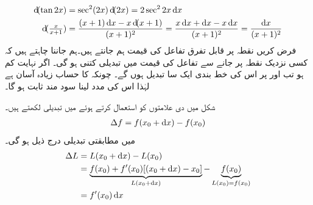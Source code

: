 \begin{align*}
\dif(\tan 2x)&=\sec^2(2x)\dif (2x)=2\sec^2 2x\dif x\\
\dif(\tfrac{x}{x+1})&=\frac{(x+1)\dif x-x\dif(x+1)}{(x+1)^2}=\frac{x\dif x+\dif x-x\dif x}{(x+1)^2}=\frac{\dif x}{(x+1)^2}
\end{align*}
فرض کریں نقطہ  پر قابل تفرق تفاعل  کی قیمت ہم جانتے ہیں۔ہم جاننا چاہتے ہیں کہ کسی نزدیک نقطہ  پر جانے سے تفاعل کی قیمت میں تبدیلی کتنی ہو گی۔ اگر  نہایت کم ہو تب  اور  پر اس کی خط بندی  ایک سا تبدیل ہوں گے۔ چونکہ  کا حساب زیادہ آسان ہے لہٰذا اس کی مدد لینا سود مند ثابت ہو گا۔

شکل  میں دی  علامتوں کو استعمال کرتے ہوئے  میں تبدیلی لکھتے ہیں۔
\begin{align*}
\Delta f=f(x_0+\dif x)-f(x_0)
\end{align*}
 میں مطابقتی تبدیلی درج ذیل ہو گی۔
\begin{align*}
\Delta L&=L(x_0+\dif x)-L(x_0)\\
&=\underbrace{f(x_0)+f'(x_0)[(x_0+\dif x)-x_0]}_{L(x_0+\dif x)}-\underbrace{f(x_0)}_{L(x_0)=f(x_0)}\\
&=f'(x_0)\dif x
\end{align*}

